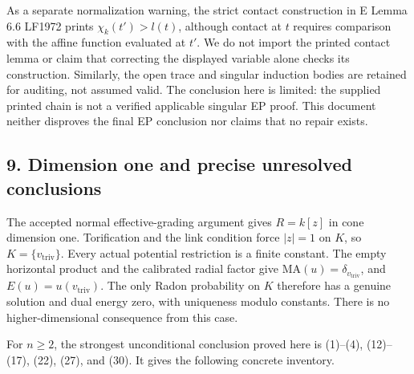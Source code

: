 \documentclass[
  10pt,
]{article}
\begin{document}
As a separate normalization warning, the strict contact construction in
E Lemma 6.6 LF1972 prints \(\chi_k(t')>l(t)\), although contact at \(t\)
requires comparison with the affine function evaluated at \(t'\). We do
not import the printed contact lemma or claim that correcting the
displayed variable alone checks its construction. Similarly, the open
trace and singular induction bodies are retained for auditing, not
assumed valid. The conclusion here is limited: the supplied printed
chain is not a verified applicable singular EP proof. This document
neither disproves the final EP conclusion nor claims that no repair
exists.

\subsection{9. Dimension one and precise unresolved
conclusions}\label{dimension-one-and-precise-unresolved-conclusions}

The accepted normal effective-grading argument gives \(R=k[z]\) in cone
dimension one. Torification and the link condition force \(|z|=1\) on
\(K\), so \(K=\{v_{\mathrm{triv}}\}\). Every actual potential
restriction is a finite constant. The empty horizontal product and the
calibrated radial factor give
\(\mathrm{MA}(u)=\delta_{v_{\mathrm{triv}}}\), and
\(E(u)=u(v_{\mathrm{triv}})\). The only Radon probability on \(K\)
therefore has a genuine solution and dual energy zero, with uniqueness
modulo constants. There is no higher-dimensional consequence from this
case.

For \(n\geq2\), the strongest unconditional conclusion proved here is
(1)--(4), (12)--(17), (22), (27), and (30). It gives the following
concrete inventory.
\end{document}

